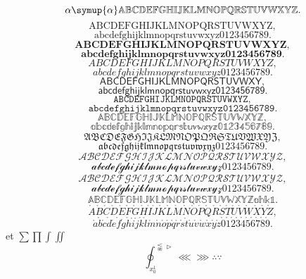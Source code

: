 \documentclass[twoside, 12pt]{article}
\begin{document}
        \[
            \alpha \symup{\alpha} \mathbb{A} \mathbb{B} \mathbb{C} \mathbb{D} \mathbb{E} \mathbb{F} \mathbb{G} \mathbb{H} \mathbb{I} \mathbb{J} \mathbb{K}%
        \mathbb{L} \mathbb{M} \mathbb{N} \mathbb{O} \mathbb{P} \mathbb{Q} \mathbb{R} \mathbb{S} \mathbb{T} \mathbb{U} \mathbb{V} \mathbb{W} \mathbb{X}%
        \mathbb{Y} \mathbb{Z} 
        .\]
        \[
            \mathrm{ABCDEFGHIJKLMNOPQRSTUVWXYZ}
        ,\]
        \[
            \mathrm{abcdefghijklmnopqrstuvwxyz0123456789}
        .\]
        \[
            \mathbf{ABCDEFGHIJKLMNOPQRSTUVWXYZ}
        ,\]
        \[
            \mathbf{abcdefghijklmnopqrstuvwxyz0123456789}
        .\]
        \[
            \mathit{ABCDEFGHIJKLMNOPQRSTUVWXYZ}
        ,\]
        \[
            \mathit{abcdefghijklmnopqrstuvwxyz0123456789}
        .\]
        \[
            \mathsf{ABCDEFGHIJKLMNOPQRSTUVWXY}
        ,\]
        \[
            \mathsf{abcdefghijklmnopqrstuvwxyz0123456789}
        .\]
        \[
            \mathtt{ABCDEFGHIJKLMNOPQRSTUVWXYZ}
        ,\]
        \[
            \mathtt{abcdefghijklmnopqrstuvwxyz0123456789}
        .\]
        \[
            \mathbb{ABCDEFGHIJKLMNOPQRSTUVWXYZ}
        ,\]
        \[
            \mathbb{abcdefghijklmnopqrstuvwxyz0123456789}
        .\]
        \[
            \mathfrak{ABCDEFGHIJKLMNOPQRSTUVWXYZ}
        ,\]
        \[
            \mathfrak{abcdefghijklmnopqrstuvwxyz0123456789}
        .\]
        \[
            \mathcal{ABCDEFGHIJKLMNOPQRSTUVWXYZ}
        ,\]
        \[
            \mathcal{abcdefghijklmnopqrstuvwxyz0123456789}
        .\]
        \[
            \mathscr{ABCDEFGHIJKLMNOPQRSTUVWXYZ}
        ,\]
        \[
            \mathscr{abcdefghijklmnopqrstuvwxyz0123456789}
        .\]
        \[
            \mathds{ABCDEFGHIJKLMNOPQRSTUVWXYZahk1}
        .\]%
        \[
            \mathring{A}\mathring{B}\mathring{C}\mathring{D}\mathring{E}\mathring{F}\mathring{G}\mathring{H}\mathring{I}
            \mathring{J}\mathring{K}\mathring{L}\mathring{M}\mathring{N}\mathring{O}\mathring{P}\mathring{Q}\mathring{R}
            \mathring{S}\mathring{T}\mathring{U}\mathring{V}\mathring{W}\mathring{X}\mathring{Y}\mathring{Z}
        ,\]
        \[
            \mathring{a}\mathring{b}\mathring{c}\mathring{d}\mathring{e}\mathring{f}\mathring{g}\mathring{h}\mathring{i}
            \mathring{j}\mathring{k}\mathring{l}\mathring{m}\mathring{n}\mathring{o}\mathring{p}\mathring{q}\mathring{r}
            \mathring{s}\mathring{t}\mathring{u}\mathring{v}\mathring{w}\mathring{x}\mathring{y}\mathring{z}\mathring{0}
            \mathring{1}\mathring{2}\mathring{3}\mathring{4}\mathring{5}\mathring{6}\mathring{7}\mathring{8}\mathring{9}
        .\]
         et 
        \(\sum \prod \int \iint \)
        \[\oint_{x_0^1}^{\lnapprox \vartriangleright}\lll \ggg \therefore \because  \]
\end{document}
